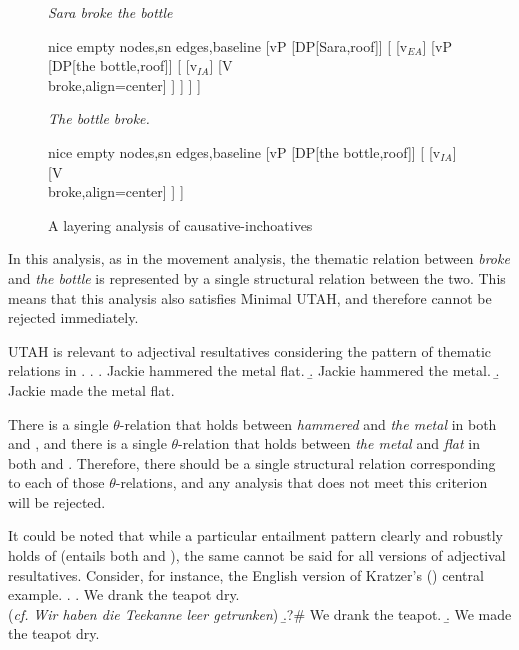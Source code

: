 \documentclass[MilwayThesis]{subfiles}
\begin{document}
\begin{figure}[h]
	\centering
	\begin{minipage}[t]{0.45\textwidth}
		\textit{Sara broke the bottle}\\
		\begin{forest}
		  nice empty nodes,sn edges,baseline
		  [vP
		    [DP[Sara,roof]]
		    [
		      [v$_{EA}$]
		      [vP
			[DP[the bottle,roof]]
			[
			  [v$_{IA}$]
			  [V\\broke,align=center]
			]
		      ]
		    ]
		  ]
		\end{forest}	
	\end{minipage}
	\begin{minipage}[t]{0.45\textwidth}
		\textit{The bottle broke.}\\
		\begin{forest}
		  nice empty nodes,sn edges,baseline
		  [vP
		    [DP[the bottle,roof]]
		    [
		      [v$_{IA}$]
		      [V\\broke,align=center]
		    ]
		  ]
		\end{forest}
	\end{minipage}
	\caption{A layering analysis of causative-inchoatives}
	\label{fig:layering}
\end{figure}
In this analysis, as in the movement analysis, the thematic relation between \textit{broke} and \textit{the bottle} is represented by a single structural relation between the two.
This means that this analysis also satisfies Minimal UTAH, and therefore cannot be rejected immediately.

UTAH is relevant to adjectival resultatives considering the pattern of thematic relations in \Next.
\ex.\label{ex:UTAHmetal}
\a.\label{ex:UTAHmetalRes} Jackie hammered the metal flat.
\b.\label{ex:UTAHmetalhammer} Jackie hammered the metal.
\b.\label{ex:UTAHmetalmetal} Jackie made the metal flat.

There is a single $\theta$-relation that holds between \textit{hammered} and \textit{the metal} in both \Last[a] and \Last[b], and there is a single $\theta$-relation that holds between \textit{the metal} and \textit{flat} in  both \Last[a] and \Last[c]. 
Therefore, there should be a single structural relation corresponding to each of those $\theta$-relations, and any analysis that does not meet this criterion will be rejected.

It could be noted that while a particular entailment pattern clearly and robustly holds of \Last (\Last[a] entails both \Last[b] and \Last[c]), the same cannot be said for all versions of adjectival resultatives.
Consider, for instance, \Next the English version of Kratzer's (\citeyear{kratzer2004building}) central example.
\ex.\label{ex:UTAHteapot}
\a.\label{ex:UTAHteapotRes} We drank the teapot dry.\\
(\textit{cf.} \textit{Wir haben die Teekanne leer getrunken})
\b.?\# \label{ex:UTAHteapotdrank} We drank the teapot.
\b. \label{ex:UTAHteapotmade} We made the teapot dry. 
\end{document}
